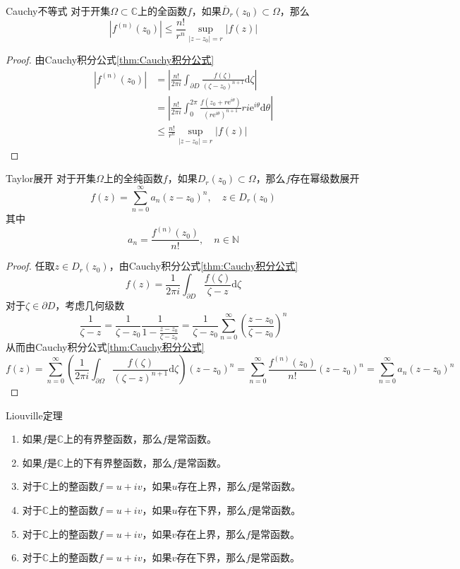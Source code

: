 \documentclass[lang = cn, scheme = chinese, thmcnt = section]{elegantbook}
\newcommand{\N}{\mathbb{N}}            %
\newcommand{\C}{\mathbb{C}}  		   %
\newcommand{\sub}{\subset}             %
\newcommand{\dd}{\mathrm{d}}           %
\newcommand{\ee}{\mathrm{e}^}           %
\begin{document}
\begin{corollary}{Cauchy不等式}
	对于开集$\Omega\sub\C$上的全函数$f$，如果$\overline{D}_r(z_0)\sub\Omega$，那么
	$$
	|f^{(n)}(z_0)| \le \frac{n!}{r^n}\sup_{|z-z_0|=r}|f(z)|
	$$
\end{corollary}

\begin{proof}
	由Cauchy积分公式\ref{thm:Cauchy积分公式}
	\begin{align*}
		|f^{(n)}(z_0)|
		& = \left| \frac{n!}{2\pi i}\int_{\partial D}{\frac{f(\zeta)}{(\zeta-z_0)^{n+1}}\mathrm{d}\zeta} \right|\\
		& = \left| \frac{n!}{2\pi i}\int_{0}^{2\pi}\frac{f(z_0+r\ee{i\theta})}{(r\ee{i\theta})^{n+1}}ri\ee{i\theta}\dd\theta \right|\\
		& \le \frac{n!}{r^n}\sup_{|z-z_0|=r}|f(z)|
	\end{align*}
\end{proof}

\begin{theorem}{Taylor展开}
	对于开集$\Omega$上的全纯函数$f$，如果$D_r(z_0)\sub\Omega$，那么$f$存在幂级数展开
	$$
	f(z)=\sum_{n=0}^{\infty}{a_n(z-z_0)^n},\quad z\in D_r(z_0)
	$$
	其中
	$$
	a_n=\frac{f^{(n)}(z_0)}{n!},\quad n\in\N
	$$
\end{theorem}

\begin{proof}
	任取$z\in D_r(z_0)$，由Cauchy积分公式\ref{thm:Cauchy积分公式}
	$$
	f(z)=\frac{1}{2\pi i}\int_{\partial  D}{\frac{f(\zeta)}{\zeta-z}\mathrm{d}\zeta}
	$$
	对于$\zeta\in \partial D$，考虑几何级数%
	$$
	\frac{1}{\zeta-z}
	=\frac{1}{\zeta-z_0}\frac{1}{1-\frac{z-z_0}{\zeta-z_0}}
	=\frac{1}{\zeta-z_0}\sum_{n=0}^{\infty}\left(\frac{z-z_0}{\zeta-z_0}\right)^n
	$$
	从而由Cauchy积分公式\ref{thm:Cauchy积分公式}
	$$
	f(z)
	=\sum_{n=0}^{\infty}{\left(\frac{1}{2\pi i}\int_{\partial\Omega}{\frac{f(\zeta)}{(\zeta-z)^{n+1}}\mathrm{d}\zeta}\right)(z-z_0)^n}
	=\sum_{n=0}^{\infty}{\frac{f^{(n)}(z_0)}{n!}(z-z_0)^n}
	=\sum_{n=0}^{\infty}{a_n(z-z_0)^n}
	$$
\end{proof}

\begin{corollary}{Liouville定理}
	\begin{enumerate}
		\item 如果$f$是$\C$上的有界整函数，那么$f$是常函数。
		\item 如果$f$是$\C$上的下有界整函数，那么$f$是常函数。
		\item 对于$\C$上的整函数$f=u+iv$，如果$u$存在上界，那么$f$是常函数。
		\item 对于$\C$上的整函数$f=u+iv$，如果$u$存在下界，那么$f$是常函数。
		\item 对于$\C$上的整函数$f=u+iv$，如果$v$存在上界，那么$f$是常函数。
		\item 对于$\C$上的整函数$f=u+iv$，如果$v$存在下界，那么$f$是常函数。
	\end{enumerate}
\end{corollary}
\end{document}
